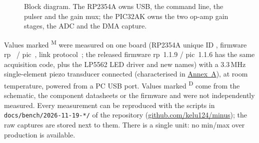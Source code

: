 \documentclass[10pt,a4paper]{article}
\newcommand{\repo}{\href{https://github.com/kelu124/minus}{github.com/kelu124/minus}}
\newcommand{\rpfwrel}{1.1.9}\newcommand{\picfwrel}{1.1.6}
\newcommand{\meas}{\textsuperscript{M}}
\newcommand{\des}{\textsuperscript{D}}
\begin{document}
\begin{figure}[H]
\caption{Block diagram. The RP2354A owns USB, the command line, the pulser and the gain mux; the PIC32AK owns the two op-amp gain stages, the ADC and the DMA capture.}
\end{figure}

\newpage
\tableofcontents
\vspace{6pt}
\begin{tcolorbox}[colback=accentlight,colframe=accent,arc=1mm,boxrule=0.5pt,title={\bfseries How to read this datasheet},fonttitle=\small]
\small Values marked \meas{} were measured on one board (RP2354A unique ID \vuid, firmware rp~\vrpfw{} / pic~\vpicfw{}, link protocol~\vproto; the released firmware rp~\rpfwrel{} / pic~\picfwrel{} has the same acquisition code, plus the LP5562 LED driver and new names)
with a 3.3\,MHz single-element piezo transducer connected (characterised in \hyperref[sec:piezo]{Annex~A}), at room temperature, powered from a PC USB port. Values marked \des{} come
from the schematic, the component datasheets or the firmware and were not independently measured. Every measurement can be
reproduced with the scripts in \texttt{docs/bench/2026-11-19-*/} of the repository (\repo); the raw captures are stored next to them.
There is a single unit: no min/max over production is available.
\end{tcolorbox}

\end{document}
